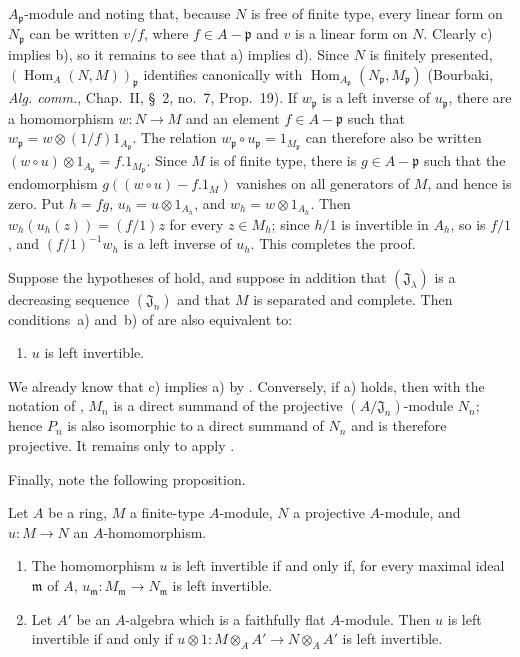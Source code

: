 $A_{\mathfrak p}$-module and noting that, because $N$ is free of finite type, every linear form on $N_{\mathfrak p}$ can be written $v/f$, where $f\in A-\mathfrak p$ and $v$ is a linear form on $N$.
Clearly c) implies b), so it remains to see that a) implies d).
Since $N$ is finitely presented, $(\operatorname{Hom}_A(N,M))_{\mathfrak p}$ identifies canonically with $\operatorname{Hom}_{A_{\mathfrak p}}(N_{\mathfrak p},M_{\mathfrak p})$ (Bourbaki, \emph{Alg. comm.}, Chap.~II, \S~2, no.~7, Prop.~19).
If $w_{\mathfrak p}$ is a left inverse of $u_{\mathfrak p}$, there are a homomorphism $w:N\to M$ and an element $f\in A-\mathfrak p$ such that $w_{\mathfrak p}=w\otimes(1/f)1_{A_{\mathfrak p}}$.
The relation $w_{\mathfrak p}\circ u_{\mathfrak p}=1_{M_{\mathfrak p}}$ can therefore also be written $(w\circ u)\otimes1_{A_{\mathfrak p}}=f.1_{M_{\mathfrak p}}$.
Since $M$ is of finite type, there is $g\in A-\mathfrak p$ such that the endomorphism $g((w\circ u)-f.1_M)$ vanishes on all generators of $M$, and hence is zero.
Put $h=fg$, $u_h=u\otimes1_{A_h}$, and $w_h=w\otimes1_{A_h}$.
Then $w_h(u_h(z))=(f/1)z$ for every $z\in M_h$;
since $h/1$ is invertible in $A_h$, so is $f/1$, and $(f/1)^{-1}w_h$ is a left inverse of $u_h$.
This completes the proof.

\begin{proposition}[19.1.13]
\label{0.19.1.13}
Suppose the hypotheses of  hold, and suppose in addition that $(\mathfrak J_\lambda)$ is a decreasing sequence $(\mathfrak J_n)$ and that $M$ is separated and complete.
Then conditions~a) and~b) of  are also equivalent to:
\begin{enumerate}
  \item[c)] $u$ is left invertible.
\end{enumerate}
\end{proposition}

We already know that c) implies a) by .
Conversely, if a) holds, then with the notation of , $M_n$ is a direct summand of the projective $(A/\mathfrak J_n)$-module $N_n$;
hence $P_n$ is also isomorphic to a direct summand of $N_n$ and is therefore projective.
It remains only to apply .

Finally, note the following proposition.

\begin{proposition}[19.1.14]
\label{0.19.1.14}
Let $A$ be a ring, $M$ a finite-type $A$-module, $N$ a projective $A$-module, and $u:M\to N$ an $A$-homomorphism.
\begin{enumerate}
  \item[(i)] The homomorphism $u$ is left invertible if and only if, for every maximal ideal $\mathfrak m$ of $A$, $u_{\mathfrak m}:M_{\mathfrak m}\to N_{\mathfrak m}$ is left invertible.
  \item[(ii)] Let $A'$ be an $A$-algebra which is a faithfully flat $A$-module.
  Then $u$ is left invertible if and only if $u\otimes1:M\otimes_AA'\to N\otimes_AA'$ is left invertible.
\end{enumerate}
\end{proposition}


